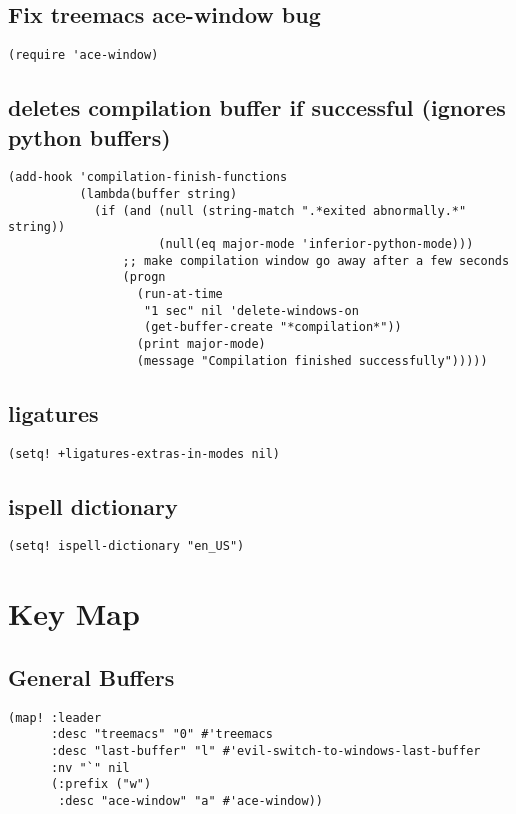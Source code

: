 \documentclass[11pt]{article}
\begin{document}
\subsection*{Fix treemacs ace-window bug}
\label{sec:orgd7ce2cb}
\begin{verbatim}
(require 'ace-window)
\end{verbatim}
\subsection*{deletes compilation buffer if successful (ignores python buffers)}
\label{sec:org14ad4c5}
\begin{verbatim}
(add-hook 'compilation-finish-functions
          (lambda(buffer string)
            (if (and (null (string-match ".*exited abnormally.*" string))
                     (null(eq major-mode 'inferior-python-mode)))
                ;; make compilation window go away after a few seconds
                (progn
                  (run-at-time
                   "1 sec" nil 'delete-windows-on
                   (get-buffer-create "*compilation*"))
                  (print major-mode)
                  (message "Compilation finished successfully")))))
\end{verbatim}
\subsection*{ligatures}
\label{sec:org16ea084}
\begin{verbatim}
(setq! +ligatures-extras-in-modes nil)
\end{verbatim}
\subsection*{ispell dictionary}
\label{sec:orgb64e23a}
\begin{verbatim}
(setq! ispell-dictionary "en_US")
\end{verbatim}

\section*{Key Map}
\label{sec:org9e3739e}
\subsection*{General Buffers}
\label{sec:orgab431c1}
\begin{verbatim}
(map! :leader
      :desc "treemacs" "0" #'treemacs
      :desc "last-buffer" "l" #'evil-switch-to-windows-last-buffer
      :nv "`" nil
      (:prefix ("w")
       :desc "ace-window" "a" #'ace-window))
\end{verbatim}
\end{document}
